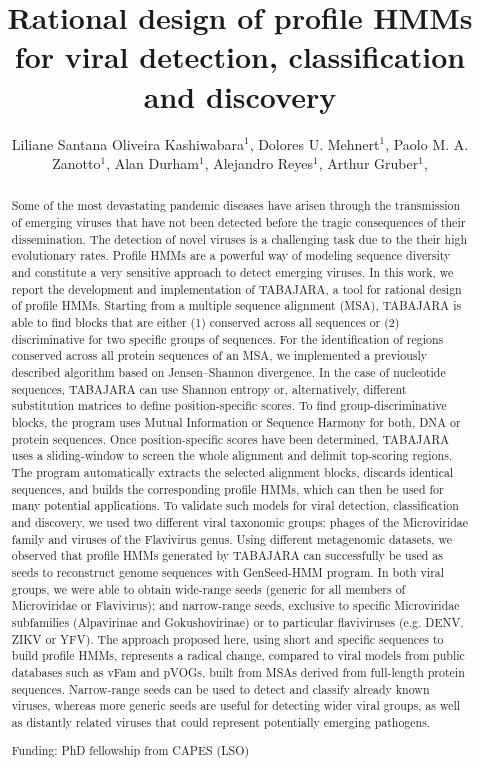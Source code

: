 \documentclass[twoside]{article}
\title{\vspace{-15mm}\fontsize{24pt}{10pt}\selectfont\textbf{ Rational design of profile HMMs for viral detection, classification and discovery }} %
\author{ Liliane Santana Oliveira Kashiwabara$^{1}$, Dolores U. Mehnert$^{1}$, Paolo M. A. Zanotto$^{1}$, Alan Durham$^{1}$, Alejandro Reyes$^{1}$, Arthur Gruber$^{1}$, }
\affil{ 1 USP

 }
\date{}
\begin{document}
  
  
  \maketitle %
  
  
  \thispagestyle{fancy} %
  
  
  \begin{abstract}
  Some of the most devastating pandemic diseases have arisen through the transmission of emerging viruses that have not been detected before the tragic consequences of their dissemination. The detection of novel viruses is a challenging task due to the their high evolutionary rates. Profile HMMs are a powerful way of modeling sequence diversity and constitute a very sensitive approach to detect emerging viruses. In this work, we report the development and implementation of TABAJARA, a tool for rational design of profile HMMs. Starting from a multiple sequence alignment (MSA), TABAJARA is able to find blocks that are either (1) conserved across all sequences or (2) discriminative for two specific groups of sequences. For the identification of regions conserved across all protein sequences of an MSA, we implemented a previously described algorithm based on Jensen–Shannon divergence. In the case of nucleotide sequences, TABAJARA can use Shannon entropy or, alternatively, different substitution matrices to define position-specific scores. To find group-discriminative blocks, the program uses Mutual Information or Sequence Harmony for both, DNA or protein sequences. Once position-specific scores have been determined, TABAJARA uses a sliding-window to screen the whole alignment and delimit top-scoring regions. The program automatically extracts the selected alignment blocks, discards identical sequences, and builds the corresponding profile HMMs, which can then be used for many potential applications. To validate such models for viral detection, classification and discovery, we used two different viral taxonomic groups: phages of the Microviridae family and viruses of the Flavivirus genus. Using different metagenomic datasets, we observed that profile HMMs generated by TABAJARA can successfully be used as seeds to reconstruct genome sequences with GenSeed-HMM program. In both viral groups, we were able to obtain wide-range seeds (generic for all members of Microviridae or Flavivirus); and narrow-range seeds, exclusive to specific Microviridae subfamilies (Alpavirinae and Gokushovirinae) or to particular flaviviruses (e.g. DENV, ZIKV or YFV). The approach proposed here, using short and specific sequences to build profile HMMs, represents a radical change, compared to viral models from public databases such as vFam and pVOGs, built from MSAs derived from full-length protein sequences. Narrow-range seeds can be used to detect and classify already known viruses, whereas more generic seeds are useful for detecting wider viral groups, as well as distantly related viruses that could represent potentially emerging pathogens.
  
  Funding: PhD fellowship from CAPES (LSO) \\ 
  \end{abstract}
  
\end{document}
